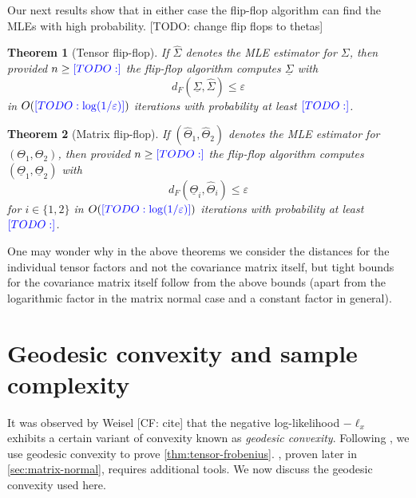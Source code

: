 \documentclass{article}
\newtheorem{theorem}{Theorem}
\newcommand\eps{\varepsilon}
\newcommand\samp{x}
\newcommand{\CF}[1]{{\color{purple}[CF: #1]}}
\newcommand{\TODO}[1]{{\color{blue}[TODO: #1]}}
\begin{document}
Our next results show that in either case the flip-flop algorithm can find the MLEs with high probability. \TODO{change flip flops to thetas}

\begin{theorem}[Tensor flip-flop]\label{thm:tensor-flipflop} If $\hat{\Sigma}$ denotes the MLE estimator for $\Sigma$, then provided $n \geq \TODO{}$ the flip-flop algorithm computes $\underline{\Sigma}$ with
$$ d_F(\underline{\Sigma}, \hat{\Sigma}) \leq \eps $$
in $O(\TODO{\log(1/\eps)})$ iterations with probability at least $\TODO{}$.
\end{theorem}

\begin{theorem}[Matrix flip-flop]\label{thm:matrix-flipflop} If $(\hat{\Theta}_1, \hat{\Theta}_2) $ denotes the MLE estimator for $(\Theta_1, \Theta_2)$, then provided $n \geq \TODO{}$ the flip-flop algorithm computes $(\underline{\Theta}_1, \underline{\Theta}_2)$ with
$$ d_F(\underline{\Theta}_i, \hat{\Theta}_i) \leq \eps $$
for $i \in \{1,2\}$ in $O(\TODO{\log(1/\eps)})$ iterations with probability at least $\TODO{}$.
\end{theorem}

One may wonder why in the above theorems we consider the distances for the individual tensor factors and not the covariance matrix itself, but tight bounds for the covariance matrix itself follow from the above bounds (apart from the logarithmic factor in the matrix normal case and a constant factor in general).




\section{Geodesic convexity and sample complexity}\label{subsec:outline}


It was observed by Weisel \CF{cite} that the negative log-likelihood $-\ell_\samp$ exhibits a certain variant of convexity known as \emph{geodesic convexity}. Following \cite{FM20}, we use geodesic convexity to prove \cref{thm:tensor-frobenius}.
, proven later in \cref{sec:matrix-normal}, requires additional tools. We now discuss the geodesic convexity used here. 
\end{document}
